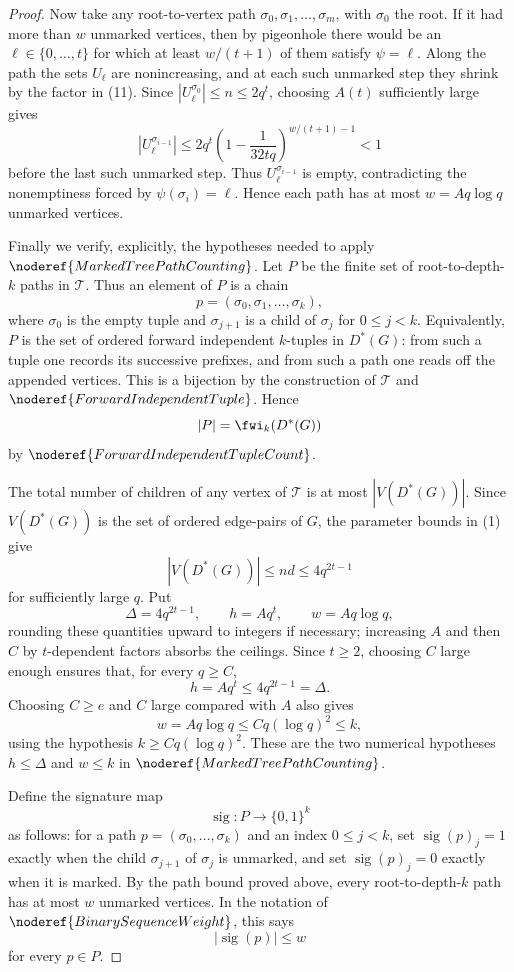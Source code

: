 \begin{proof}
Now take any root-to-vertex path
\(\sigma_0,\sigma_1,\ldots,\sigma_m\), with \(\sigma_0\) the root.  If it
had more than \(w\) unmarked vertices, then by pigeonhole there would be an
\(\ell\in\{0,\ldots,t\}\) for which at least \(w/(t+1)\) of them satisfy
\(\psi=\ell\).  Along the path the sets \(U_\ell\) are nonincreasing, and at
each such unmarked step they shrink by the factor in (11).  Since
\(|U_\ell^{\sigma_0}|\le n\le2q^t\), choosing \(A(t)\) sufficiently large
gives
\[
  |U_\ell^{\sigma_{i-1}}|
  \le
  2q^t
  \left(1-\frac1{32tq}\right)^{w/(t+1)-1}
  <1
\]
before the last such unmarked step.  Thus \(U_\ell^{\sigma_{i-1}}\) is empty,
contradicting the nonemptiness forced by \(\psi(\sigma_i)=\ell\).  Hence
each path has at most \(w=Aq\log q\) unmarked vertices.

Finally we verify, explicitly, the hypotheses needed to apply
\(\noderef{MarkedTreePathCounting}\).  Let \(P\) be the finite set of
root-to-depth-\(k\) paths in \(\mathcal T\).  Thus an element of \(P\) is a
chain
\[
  p=(\sigma_0,\sigma_1,\ldots,\sigma_k),
\]
where \(\sigma_0\) is the empty tuple and \(\sigma_{j+1}\) is a child of
\(\sigma_j\) for \(0\le j<k\).  Equivalently, \(P\) is the set of ordered
forward independent \(k\)-tuples in \(D^*(G)\): from such a tuple one records
its successive prefixes, and from such a path one reads off the appended
vertices.  This is a bijection by the construction of \(\mathcal T\) and
\(\noderef{ForwardIndependentTuple}\).  Hence
\[
  |P|=\fwi_k(D^*(G))
\]
by \(\noderef{ForwardIndependentTupleCount}\).

The total number of children of any vertex of \(\mathcal T\) is at most
\(|V(D^*(G))|\).  Since \(V(D^*(G))\) is the set of ordered edge-pairs of
\(G\), the parameter bounds in (1) give
\[
  |V(D^*(G))|\le nd\le 4q^{2t-1}
\]
for sufficiently large \(q\).  Put
\[
  \Delta=4q^{2t-1},\qquad h=Aq^t,\qquad w=Aq\log q,
\]
rounding these quantities upward to integers if necessary; increasing \(A\)
and then \(C\) by \(t\)-dependent factors absorbs the ceilings.  Since
\(t\ge2\), choosing \(C\) large enough ensures that, for every \(q\ge C\),
\[
  h=Aq^t\le 4q^{2t-1}=\Delta.
\]
Choosing \(C\ge e\) and \(C\) large compared with \(A\) also gives
\[
  w=Aq\log q\le Cq(\log q)^2\le k,
\]
using the hypothesis \(k\ge Cq(\log q)^2\).  These are the two numerical
hypotheses \(h\le\Delta\) and \(w\le k\) in
\(\noderef{MarkedTreePathCounting}\).

Define the signature map
\[
  \operatorname{sig}:P\to\{0,1\}^k
\]
as follows: for a path \(p=(\sigma_0,\ldots,\sigma_k)\) and an index
\(0\le j<k\), set \(\operatorname{sig}(p)_j=1\) exactly when the child
\(\sigma_{j+1}\) of \(\sigma_j\) is unmarked, and set
\(\operatorname{sig}(p)_j=0\) exactly when it is marked.  By the path bound
proved above, every root-to-depth-\(k\) path has at most \(w\) unmarked
vertices.  In the notation of \(\noderef{BinarySequenceWeight}\), this says
\[
  |\operatorname{sig}(p)|\le w
\]
for every \(p\in P\).


\end{proof}
